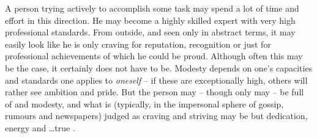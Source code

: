 A person trying actively to accomplish some task may spend a lot of time
and effort in this direction.  He may become a highly skilled expert with very
high professional standards.  From outside, and seen only in abstract terms, it
may easily look like he is only craving for reputation, recognition or just for
professional achievements of which he could be proud. Although often this may be
the case, it certainly does not have to be.
Modesty depends on one's capacities and standards one applies to
{\em oneself} -- if these are exceptionally high, others will rather see
ambition and pride.  But the person may -- though
only may -- be full of  and modesty, and what is (typically, in the
impersonal sphere of gossip, rumours and newspapers) judged as
craving and striving may be but dedication, energy and \ldots true .

